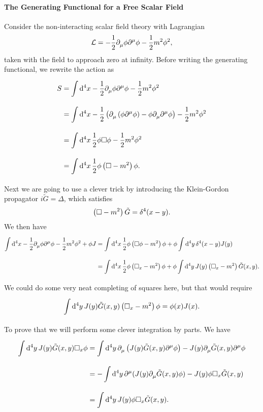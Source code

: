 \paragraph{The Generating Functional for a Free Scalar Field}
Consider the non-interacting scalar field theory with Lagrangian
\begin{align*}
	\mathcal{L} = -\frac{1}{2}\partial^{}_{\mu}\phi\partial^{\mu}_{}\phi - \frac{1}{2}m^{2}\phi^{2},
\end{align*}
taken with the field to approach zero at infinity. Before writing the generating functional, we rewrite the action as
\begin{align*}
	S &= \int\limits_{}^{}\dd[4]{x}-\frac{1}{2}\partial^{}_{\mu}\phi\partial^{\mu}_{}\phi - \frac{1}{2}m^{2}\phi^{2} \\
	  &= \int\limits_{}^{}\dd[4]{x}-\frac{1}{2}\left(\partial^{}_{\mu}\left(\phi\partial^{\mu}_{}\phi\right) - \phi\partial^{}_{\mu}\partial^{\mu}_{}\phi\right) - \frac{1}{2}m^{2}\phi^{2} \\
	  &= \int\limits_{}^{}\dd[4]{x}\frac{1}{2}\phi\square\phi - \frac{1}{2}m^{2}\phi^{2} \\
	  &= \int\limits_{}^{}\dd[4]{x}\frac{1}{2}\phi\left(\square - m^{2}\right)\phi.
\end{align*}
Next we are going to use a clever trick by introducing the Klein-Gordon propagator $i\tilde{G} = \Delta$, which satisfies
\begin{align*}
	\left(\square - m^{2}\right)\tilde{G} = \delta^{4}(x - y).
\end{align*}
We then have
\begin{align*}
	\int\limits_{}^{}\dd[4]{x}-\frac{1}{2}\partial^{}_{\mu}\phi\partial^{\mu}_{}\phi - \frac{1}{2}m^{2}\phi^{2} + \phi J &= \int\limits_{}^{}\dd[4]{x}\frac{1}{2}\phi\left(\square\phi - m^{2}\right)\phi + \phi\int\limits_{}^{}\dd[4]{y}\delta^{4}(x - y)J(y) \\
	&= \int\limits_{}^{}\dd[4]{x}\frac{1}{2}\phi\left(\square_{x} - m^{2}\right)\phi + \phi\int\limits_{}^{}\dd[4]{y}J(y)\left(\square_{x} - m^{2}\right)\tilde{G}(x, y).
\end{align*}
We could do some very neat completing of squares here, but that would require
\begin{align*}
	\int\limits_{}^{}\dd[4]{y}J(y)\tilde{G}(x, y)\left(\square_{x} - m^{2}\right)\phi = \phi(x)J(x).
\end{align*}
To prove that we will perform some clever integration by parts. We have
\begin{align*}
	\int\limits_{}^{}\dd[4]{y}J(y)\tilde{G}(x, y)\square_{x}\phi &= \int\limits_{}^{}\dd[4]{y}\partial^{}_{\mu}\left(J(y)\tilde{G}(x, y)\partial^{\mu}_{}\phi\right) - J(y)\partial^{}_{\mu}\tilde{G}(x, y)\partial^{\mu}_{}\phi \\
	&= -\int\limits_{}^{}\dd[4]{y}\partial^{\mu}_{}(J(y)\partial^{}_{\mu}\tilde{G}(x, y)\phi) - J(y)\phi\square_{x}\tilde{G}(x, y) \\
	&= \int\limits_{}^{}\dd[4]{y}J(y)\phi\square_{x}\tilde{G}(x, y).
\end{align*}

